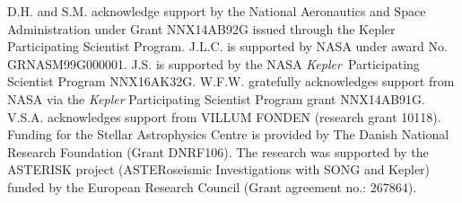 \documentclass[twocolumn,tighten,trackchanges]{aastex61}
\renewcommand{\_}{\discretionary{\underscore}{}{\underscore}}  %
\newcommand\Kepler{\textit{Kepler}}
\begin{document}
D.H. and S.M. acknowledge support by the National Aeronautics and Space Administration under Grant NNX14AB92G issued through the Kepler Participating Scientist Program. J.L.C. is supported by NASA under award No. GRNASM99G000001. J.S. is supported by the NASA \Kepler\ Participating Scientist Program NNX16AK32G.  W.F.W. gratefully acknowledges support from NASA via the \Kepler{} Participating Scientist Program grant NNX14AB91G. V.S.A. acknowledges support from VILLUM FONDEN (research grant 10118).
Funding for the Stellar Astrophysics Centre is provided by The Danish National Research Foundation (Grant DNRF106). The research was supported by the ASTERISK project (ASTERoseismic Investigations with SONG and Kepler) funded by the European Research Council (Grant agreement no.: 267864).


%




\appendix
\twocolumngrid



\clearpage

\listofchanges
\end{document}
